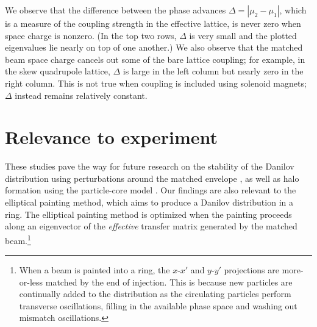 %
We observe that the difference between the phase advances $\Delta = |\mu_2 - \mu_1|$, which is a measure of the coupling strength in the effective lattice, is never zero when space charge is nonzero. (In the top two rows, $\Delta$ is very small and the plotted eigenvalues lie nearly on top of one another.) We also observe that the matched beam space charge cancels out some of the bare lattice coupling; for example, in the skew quadrupole lattice, $\Delta$ is large in the left column but nearly zero in the right column. This is not true when coupling is included using solenoid magnets; $\Delta$ instead remains relatively constant.  


\section{Relevance to experiment}

These studies pave the way for future research on the stability of the Danilov distribution using perturbations around the matched envelope \cite{Goswami2016}, as well as halo formation using the particle-core model \cite{Wangler1998, Gluckstern1994, Gluckstern1998}. Our findings are also relevant to the elliptical painting method, which aims to produce a Danilov distribution in a ring. The elliptical painting method is optimized when the painting proceeds along an eigenvector of the \textit{effective} transfer matrix generated by the matched beam.\footnote{When a beam is painted into a ring, the $x$-$x'$ and $y$-$y'$ projections are more-or-less matched by the end of injection. This is because new particles are continually added to the distribution as the circulating particles perform transverse oscillations, filling in the available phase space and washing out mismatch oscillations.}
%

